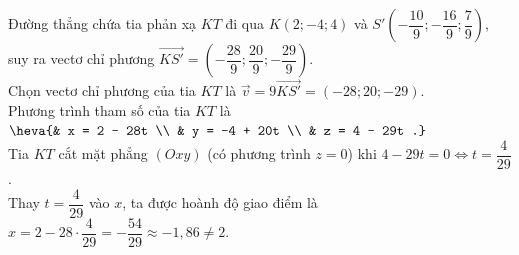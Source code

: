 \begin{ex}
{\begin{itemchoice}
			Đường thẳng chứa tia phản xạ $KT$ đi qua $K(2;-4;4)$ và $S'\left(-\dfrac{10}{9}; -\dfrac{16}{9}; \dfrac{7}{9}\right)$, suy ra vectơ chỉ phương $\overrightarrow{KS'} = \left(-\dfrac{28}{9}; \dfrac{20}{9}; -\dfrac{29}{9}\right)$.\\
			Chọn vectơ chỉ phương của tia $KT$ là $\overrightarrow{v} = 9\overrightarrow{KS'} = (-28;20;-29)$.\\
			Phương trình tham số của tia $KT$ là $\heva{& x = 2 - 28t \\ & y = -4 + 20t \\ & z = 4 - 29t .}$\\
			Tia $KT$ cắt mặt phẳng $(Oxy)$ (có phương trình $z=0$) khi $4 - 29t = 0 \Leftrightarrow t = \dfrac{4}{29}$.\\
			Thay $t=\dfrac{4}{29}$ vào $x$, ta được hoành độ giao điểm là $x = 2 - 28\cdot\dfrac{4}{29} = -\dfrac{54}{29} \approx -1{,}86 \neq 2$.
		\end{itemchoice}
	}
\end{ex}

